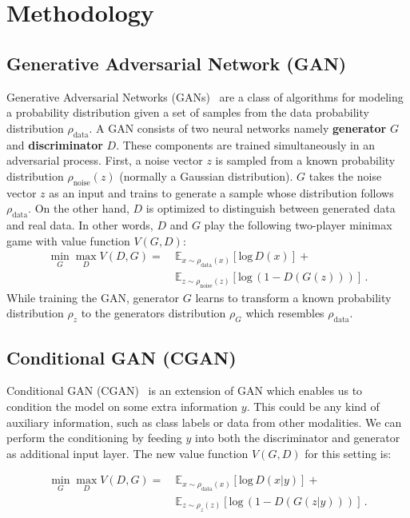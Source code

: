 \documentclass{ieeeaccess}
\begin{document}
\section{Methodology}
\label{sec:method}
\subsection{Generative Adversarial Network (GAN)}
Generative Adversarial Networks (GANs)~\cite{goodfellow2014generative} are a class of algorithms for modeling a probability distribution given a set of samples from the data probability distribution $\rho_\text{data}$. A GAN consists of two neural networks namely \textbf{generator} $G$ and \textbf{discriminator} $D$. These components are trained simultaneously in an adversarial process. First, a noise vector $z$ is sampled from a known probability distribution $\rho_\text{noise}(z)$ (normally a Gaussian distribution). $G$ takes the noise vector $z$ as an input and trains to generate a sample whose distribution follows $\rho_\text{data}$. On the other hand, $D$ is optimized to distinguish between generated data and real data. In other words, $D$ and $G$ play the following two-player minimax game with value function $V (G, D)$:
\begin{equation*}
\begin{aligned}
\min_{G} \max_{D} V(D,G) = \ &\mathbb{E}_{x\sim\rho_\text{data}(x)}[\text{log}\, D(x)] + \\ &\mathbb{E}_{z\sim\rho_\text{noise}(z)}[\text{log}\,(1-D(G(z)))]\,.
\label{eq:gan}
\end{aligned}
\end{equation*}
While training the GAN, generator $G$ learns to transform a known probability distribution $\rho_{z}$ to the generators distribution $\rho_{G}$ which resembles $\rho_\text{data}$.

\subsection{Conditional GAN (CGAN)}
Conditional GAN (CGAN)~\cite{mirza2014conditional} is an extension of GAN which enables us to condition the model on some extra information $y$. This could be any kind of auxiliary information, such as class labels or data from other modalities. We can perform the conditioning by feeding $y$ into both the discriminator and generator as additional input layer. The new value function $V(G,D)$ for this setting is:

\begin{equation*}
\begin{aligned}
\min_{G} \max_{D} V(D,G) = \ &\mathbb{E}_{x\sim\rho_\text{data}(x)}[\text{log}\, D(x|y)] +\\ &\mathbb{E}_{z\sim\rho_{z}(z)}[\text{log}\,(1-D(G(z|y)))]\,.
\label{eq:cgan}
\end{aligned}
\end{equation*}
\end{document}
